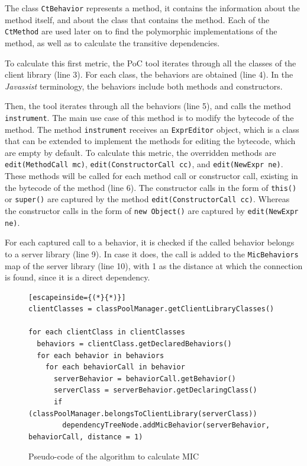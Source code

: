 The class \texttt{CtBehavior} represents a method, it contains the information about the method itself, and about the class that contains the method. Each of the \texttt{CtMethod} are used later on to find the polymorphic implementations of the method, as well as to calculate the transitive dependencies.

To calculate this first metric, the PoC tool iterates through all the classes of the client library (line 3). For each class, the behaviors are obtained (line 4). In the \textit{Javassist} terminology, the behaviors include both methods and constructors.

Then, the tool iterates through all the behaviors (line 5), and calls the method \texttt{instrument}. The main use case of this method is to modify the bytecode of the method. The method \texttt{instrument} receives an \texttt{ExprEditor} object, which is a class that can be extended to implement the methods for editing the bytecode, which are empty by default. To calculate this metric, the overridden methods are \texttt{edit(MethodCall mc)}, \texttt{edit(ConstructorCall cc)}, and \texttt{edit(NewExpr ne)}. These methods will be called for each method call or constructor call, existing in the bytecode of the method (line 6). The constructor calls in the form of \texttt{this()} or \texttt{super()} are captured by the method \texttt{edit(ConstructorCall cc)}. Whereas the constructor calls in the form of \texttt{new Object()} are captured by \texttt{edit(NewExpr ne)}.

For each captured call to a behavior, it is checked if the called behavior belongs to a server library (line 9). In case it does, the call is added to the \texttt{MicBehaviors} map of the server library (line 10), with 1 as the distance at which the connection is found, since it is a direct dependency.

\begin{figure}[ht!]
\begin{lstlisting}[escapeinside={(*}{*)}]
clientClasses = classPoolManager.getClientLibraryClasses()

for each clientClass in clientClasses
  behaviors = clientClass.getDeclaredBehaviors()
  for each behavior in behaviors
    for each behaviorCall in behavior
      serverBehavior = behaviorCall.getBehavior()
      serverClass = serverBehavior.getDeclaringClass()
      if (classPoolManager.belongsToClientLibrary(serverClass))
        dependencyTreeNode.addMicBehavior(serverBehavior, behaviorCall, distance = 1)
\end{lstlisting}
\caption{Pseudo-code of the algorithm to calculate MIC}
\label{fig:algorithm-mic}
\end{figure}

